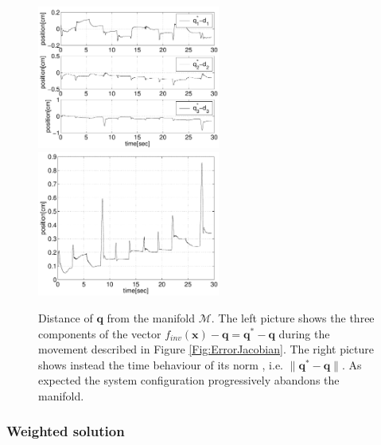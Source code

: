 \documentclass[conference]{IEEEtran}
\numberwithin{equation}{section}
\newcommand{\q}{\mathbf{q}}
\newcommand{\x}{\mathbf{x}}
\begin{document}
\begin{figure}[tbp]
\centering 
\includegraphics[width=60mm]{image/ManifoldDistanceQJacobian.pdf} 
\includegraphics[width=60mm]{image/ManifoldDistanceJacobian.pdf} 
\caption{Distance of $\q$ from the manifold $\mathcal M$. The left picture shows the three components of the vector $f_{inv}(\x) -\q  = \q^* -\q$ during the movement described in Figure \ref{Fig:ErrorJacobian}. The right picture shows instead the time behaviour of its norm , i.e. $\| \q^* - \q \|$. As expected the system configuration progressively abandons the manifold.}
\label{Fig:ManifoldDistanceJacobian}
\end{figure}

\subsubsection{Weighted solution} \label{Sec:WeightedSolution}
\end{document}
